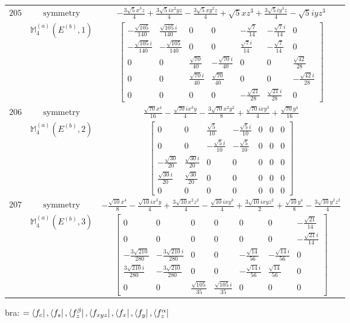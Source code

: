 \documentclass[fleqn,8pt,landscape]{jsarticle}
\begin{document}
\begin{longtable}{ccc}
$ 205 $ & $ \text{symmetry} $ & $ - \frac{3 \sqrt{5} x^{3} z}{4} + \frac{3 \sqrt{5} i x^{2} y z}{4} - \frac{3 \sqrt{5} x y^{2} z}{4} + \sqrt{5} x z^{3} + \frac{3 \sqrt{5} i y^{3} z}{4} - \sqrt{5} i y z^{3} $ \\
$  $ & $ \mathbb{M}_{4}^{(a)}(E^{(b)},1) $ & $ \begin{bmatrix} - \frac{\sqrt{105}}{140} & \frac{\sqrt{105} i}{140} & 0 & 0 & - \frac{\sqrt{7}}{14} & - \frac{\sqrt{7} i}{14} & 0 \\ - \frac{\sqrt{105} i}{140} & - \frac{\sqrt{105}}{140} & 0 & 0 & \frac{\sqrt{7} i}{14} & - \frac{\sqrt{7}}{14} & 0 \\ 0 & 0 & \frac{\sqrt{70}}{40} & - \frac{\sqrt{70} i}{40} & 0 & 0 & \frac{\sqrt{42}}{28} \\ 0 & 0 & \frac{\sqrt{70} i}{40} & \frac{\sqrt{70}}{40} & 0 & 0 & - \frac{\sqrt{42} i}{28} \\ 0 & 0 & 0 & 0 & - \frac{\sqrt{21}}{28} & \frac{\sqrt{21} i}{28} & 0 \end{bmatrix} $ \\ \hline
$ 206 $ & $ \text{symmetry} $ & $ \frac{\sqrt{70} x^{4}}{16} - \frac{\sqrt{70} i x^{3} y}{4} - \frac{3 \sqrt{70} x^{2} y^{2}}{8} + \frac{\sqrt{70} i x y^{3}}{4} + \frac{\sqrt{70} y^{4}}{16} $ \\
$  $ & $ \mathbb{M}_{4}^{(a)}(E^{(b)},2) $ & $ \begin{bmatrix} 0 & 0 & \frac{\sqrt{5}}{10} & - \frac{\sqrt{5} i}{10} & 0 & 0 & 0 \\ 0 & 0 & - \frac{\sqrt{5} i}{10} & - \frac{\sqrt{5}}{10} & 0 & 0 & 0 \\ - \frac{\sqrt{30}}{20} & \frac{\sqrt{30} i}{20} & 0 & 0 & 0 & 0 & 0 \\ \frac{\sqrt{30} i}{20} & \frac{\sqrt{30}}{20} & 0 & 0 & 0 & 0 & 0 \\ 0 & 0 & 0 & 0 & 0 & 0 & 0 \end{bmatrix} $ \\ \hline
$ 207 $ & $ \text{symmetry} $ & $ - \frac{\sqrt{10} x^{4}}{8} - \frac{\sqrt{10} i x^{3} y}{4} + \frac{3 \sqrt{10} x^{2} z^{2}}{4} - \frac{\sqrt{10} i x y^{3}}{4} + \frac{3 \sqrt{10} i x y z^{2}}{2} + \frac{\sqrt{10} y^{4}}{8} - \frac{3 \sqrt{10} y^{2} z^{2}}{4} $ \\
$  $ & $ \mathbb{M}_{4}^{(a)}(E^{(b)},3) $ & $ \begin{bmatrix} 0 & 0 & 0 & 0 & 0 & 0 & - \frac{\sqrt{21}}{14} \\ 0 & 0 & 0 & 0 & 0 & 0 & - \frac{\sqrt{21} i}{14} \\ - \frac{3 \sqrt{210}}{280} & - \frac{3 \sqrt{210} i}{280} & 0 & 0 & - \frac{\sqrt{14}}{56} & - \frac{\sqrt{14} i}{56} & 0 \\ \frac{3 \sqrt{210} i}{280} & - \frac{3 \sqrt{210}}{280} & 0 & 0 & - \frac{\sqrt{14} i}{56} & \frac{\sqrt{14}}{56} & 0 \\ 0 & 0 & \frac{\sqrt{105}}{35} & \frac{\sqrt{105} i}{35} & 0 & 0 & 0 \end{bmatrix} $ \\ \hline
\end{longtable}
bra: $=\bra{f_{c}}, \bra{f_{s}}, \bra{f_{z}^{\beta}}, \bra{f_{xyz}}, \bra{f_{x}}, \bra{f_{y}}, \bra{f_{z}^{\alpha}}$
\end{document}
